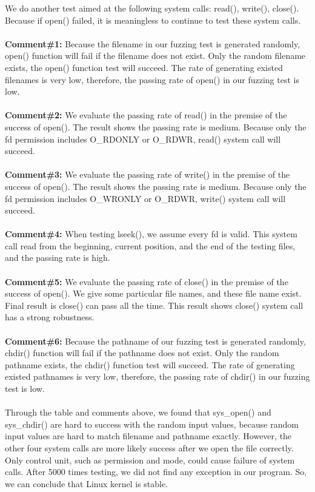 \documentclass[twoside]{article}
\begin{document}
\begin{multicols}{2}
\noindent
We do another test aimed at the following system calls: read(), write(), close(). Because if open() failed, it is meaningless to continue to test these system calls.
\\\\
\noindent
{\bf Comment\#1:} Because the filename in our fuzzing test is generated randomly, open() function will fail if the filename does not exist. Only the random filename exists, the open() function test will succeed. The rate of generating existed filenames is very low, therefore, the passing rate of open() in our fuzzing test is low.
\\\\
\noindent
{\bf Comment\#2:} We evaluate the passing rate of read() in the premise of the success of open(). The result shows the passing rate is medium. Because only the fd permission includes O\_RDONLY or O\_RDWR, read() system call will succeed. 
\\\\
\noindent
{\bf Comment\#3:} We evaluate the passing rate of write() in the premise of the success of open(). The result shows the passing rate is medium. Because only the fd permission includes O\_WRONLY or O\_RDWR, write() system call will succeed. 
\\\\
\noindent
{\bf Comment\#4:} When testing lseek(), we assume every fd is valid. This system call read from the beginning, current position, and the end of the testing files, and the passing rate is high. 
\\\\
\noindent
{\bf Comment\#5:} We evaluate the passing rate of close() in the premise of the success of open(). We give some particular file names, and these file name exist. Final result is close() can pass all the time. This result shows close() system call has a strong robustness. 
\\\\
\noindent
{\bf Comment\#6:} Because the pathname of our fuzzing test is generated randomly, chdir() function will fail if the pathname does not exist. Only the random pathname exists, the chdir() function test will succeed. The rate of generating existed pathnames is very low, therefore, the passing rate of chdir() in our fuzzing test is low.
\\\\
\noindent
Through the table and comments above, we found that sys\_open() and sys\_chdir() are hard to success with the random input values, because random input values are hard to match filename and pathname exactly. However, the other four system calls are more likely success after we open the file correctly. Only control unit, such as permission and mode, could cause failure of system calls. After 5000 times testing, we did not find any exception in our program. So, we can conclude that Linux kernel is stable.



\end{multicols}
\end{document}
